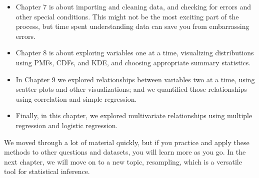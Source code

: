 \begin{itemize}
\item
  Chapter 7 is about importing and cleaning data, and checking for
  errors and other special conditions. This might not be the most
  exciting part of the process, but time spent understanding data can
  save you from embarrassing errors.
\item
  Chapter 8 is about exploring variables one at a time, visualizing
  distributions using PMFs, CDFs, and KDE, and choosing appropriate
  summary statistics.
\item
  In Chapter 9 we explored relationships between variables two at a
  time, using scatter plots and other visualizations; and we quantified
  those relationships using correlation and simple regression.
\item
  Finally, in this chapter, we explored multivariate relationships using
  multiple regression and logistic regression.
\end{itemize}

We moved through a lot of material quickly, but if you practice and
apply these methods to other questions and datasets, you will learn more
as you go. In the next chapter, we will move on to a new topic,
resampling, which is a versatile tool for statistical inference.
